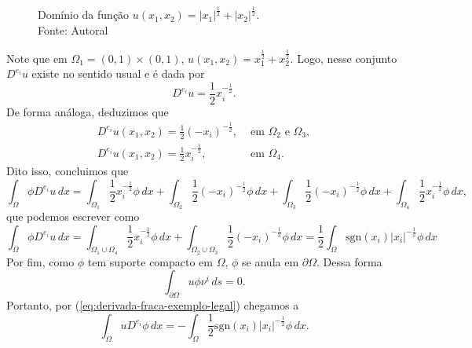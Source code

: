 \documentclass[a4paper, 11pt]{book}
\theoremstyle{definition}
\newcommand{\sgn}{\mathrm{sgn}}
\begin{document}
\begin{ex}
\begin{figure}[H]
        \caption{Domínio da função $u(x_1,x_2) = |x_1|^{\frac{1}{2}} + |x_2|^{\frac{1}{2}}$.\\
        Fonte: Autoral}
        \label{fig:dominio}
    \end{figure}
    Note que em $\Omega_1 = (0,1) \times (0,1)$, $u(x_1,x_2) = x_1^{\frac{1}{2}} + x_2^{\frac{1}{2}}$. Logo, nesse conjunto $D^{e_i} u$ existe no sentido usual e é dada por
    \[
        D^{e_i} u = \frac{1}{2} x_i^{-\frac{1}{2}}.
    \]
    De forma análoga, deduzimos que
    \[
        \begin{array}{ll}
            D^{e_i} u(x_1,x_2) = \frac{1}{2} (-x_i)^{-\frac{1}{2}}, &\text{ em } \Omega_2 \text{ e } \Omega_3, \\
            D^{e_i} u(x_1,x_2) = \frac{1}{2} x_i^{-\frac{1}{2}}, &\text{ em } \Omega_4.
        \end{array}
    \]
    Dito isso, concluimos que
    \[
        \int_\Omega \phi D^{e_i}u \,dx = \int_{\Omega_1}  \frac{1}{2} x_i^{-\frac{1}{2}}\phi \,dx + \int_{\Omega_2} \frac{1}{2} (-x_i)^{-\frac{1}{2}} \phi \,dx + \int_{\Omega_3} \frac{1}{2} (-x_i)^{-\frac{1}{2}} \phi \,dx + \int_{\Omega_4} \frac{1}{2} x_i^{-\frac{1}{2}} \phi \,dx,
    \]
    que podemos escrever como
    \[
        \int_\Omega \phi D^{e_i} u \,dx = \int_{\Omega_1 \cup \Omega_4}  \frac{1}{2} x_i^{-\frac{1}{2}}\phi \,dx + \int_{\Omega_2 \cup \Omega_3} \frac{1}{2} (-x_i)^{-\frac{1}{2}} \phi \,dx = \frac{1}{2}\int_\Omega \sgn(x_i) |x_i|^{-\frac{1}{2}} \phi \,dx
    \]
    Por fim, como $\phi$ tem suporte compacto em $\Omega$, $\phi$ se anula em $\partial\Omega$.
    Dessa forma
    \[
        \int_{\partial\Omega} u \phi \nu^i \,ds = 0.
    \]
    Portanto, por (\ref{eq:derivada-fraca-exemplo-legal}) chegamos a
    \[
        \int_\Omega  u D^{e_i} \phi \,dx = - \int_\Omega \frac{1}{2}\sgn(x_i) |x_i|^{-\frac{1}{2}} \phi \,dx.
\]
\end{ex}
\end{document}
